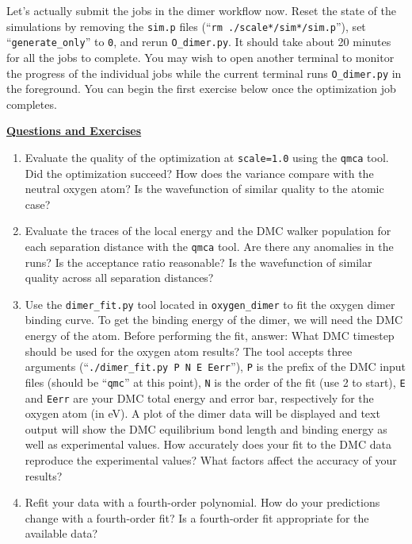 Let's actually submit the jobs in the dimer workflow now.  Reset the state of the simulations by removing the \texttt{sim.p} files (``\texttt{rm ./scale*/sim*/sim.p}''), set ``\texttt{generate\_only}'' to \texttt{0}, and rerun \texttt{O\_dimer.py}.  It should take about 20 minutes for all the jobs to complete.  You may wish to open another terminal to monitor the progress of the individual jobs while the current terminal runs \texttt{O\_dimer.py} in the foreground.  You can begin the first exercise below once the optimization job completes.

\vspace{3cm}
\begin{flushleft}
\textbf{\underline{Questions and Exercises}}
\end{flushleft}
\begin{enumerate}
  \item{Evaluate the quality of the optimization at \texttt{scale=1.0} using the \texttt{qmca} tool.  Did the optimization succeed?  How does the variance compare with the neutral oxygen atom?  Is the wavefunction of similar quality to the atomic case?}

  \item{Evaluate the traces of the local energy and the DMC walker population for each separation distance with the \texttt{qmca} tool.  Are there any anomalies in the runs?  Is the acceptance ratio reasonable?  Is the wavefunction of similar quality across all separation distances?}

  \item{Use the \texttt{dimer\_fit.py} tool located in \texttt{oxygen\_dimer} to fit the oxygen dimer binding curve.   To get the binding energy of the dimer, we will need the DMC energy of the atom.  Before performing the fit, answer: What DMC timestep should be used for the oxygen atom results?  The tool accepts three arguments (``\verb|./dimer_fit.py P N E Eerr|''}), \texttt{P} is the prefix of the DMC input files (should be ``\texttt{qmc}'' at this point), \texttt{N} is the order of the fit (use 2 to start), \texttt{E} and \texttt{Eerr} are your DMC total energy and error bar, respectively for the oxygen atom (in eV).  A plot of the dimer data will be displayed and text output will show the DMC equilibrium bond length and binding energy as well as experimental values.  How accurately does your fit to the DMC data reproduce the experimental values?  What factors affect the accuracy of your results? 

  \item{Refit your data with a fourth-order polynomial.  How do your predictions change with a fourth-order fit?  Is a fourth-order fit appropriate for the available data?}
 

\end{enumerate}
